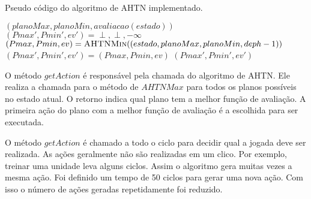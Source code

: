 \begin{algorithm}[ht]
	\caption{Pseudo código do algoritmo de AHTN implementado.}
	\label{alg:meuahtn}
 	\begin{algorithmic}[1]		
	 		 \label{alg:meuahtn:terminal}
		 		\State	\Return $(planoMax, planoMin, avaliacao(estado))$
	 		\EndIf
	 		 \label{alg:meuahtn:nexaction}
	 		\State $(Pmax', Pmin', ev') = \perp, \perp, -\infty$
			 \label{alg:meuahtn:for}
		 		\State $(Pmax, Pmin, ev) = \Call{AHTNMin}{(estado, planoMax, planoMin, deph-1)}$ \label{alg:meuahtn:ahtnmin}
			 	 \label{alg:meuahtn:avali}
					\State $(Pmax', Pmin', ev') = (Pmax, Pmin, ev)$
				\EndIf		 		 		
		 	\EndFor
		 	\State \Return $(Pmax', Pmin', ev')$ \label{alg:meuahtn:retorno}
 		\EndFunction
 	\end{algorithmic}
 \end{algorithm}
 
 
O método $\mathit{getAction}$ é responsável pela chamada do algoritmo de AHTN. 
Ele realiza a chamada para o método de $\mathit{AHTNMax}$ para todos os planos possíveis no estado atual.
O retorno indica qual plano tem a melhor função de avaliação.
A primeira ação do plano com a melhor função de avaliação é a escolhida para ser executada. 

O método $\mathit{getAction}$ é chamado a todo o ciclo para decidir qual a jogada deve ser realizada.
As ações geralmente não são realizadas em um clico.
Por exemplo, treinar uma unidade leva alguns ciclos.
Assim o algoritmo gera muitas vezes a mesma ação.
Foi definido um tempo de 50 ciclos para gerar uma nova ação.
Com isso o número de ações geradas repetidamente foi reduzido.

